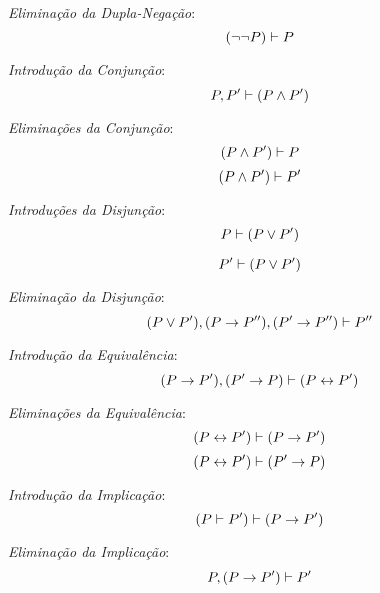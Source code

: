 \emph{Eliminação da Dupla-Negação}:
	\begin{equation*}
	(\lnot\lnot P) \vdash P
	\end{equation*}

\emph{Introdução da Conjunção}:
	\begin{equation*}
	P, P' \vdash (P \land P')
	\end{equation*}

\emph{Eliminações da Conjunção}:
	\begin{equation*}
	(P \land P') \vdash P
	\end{equation*}
	\begin{equation*}
	(P \land P') \vdash P'
	\end{equation*}

\emph{Introduções da Disjunção}:
	\begin{equation*}
	P \vdash (P \lor P')
	\end{equation*}

	\begin{equation*}
	P' \vdash (P \lor P')
	\end{equation*}

\emph{Eliminação da Disjunção}:
	\begin{equation*}
	(P \lor P'), (P \rightarrow P''), (P' \rightarrow P'') \vdash P''
	\end{equation*}

\emph{Introdução da Equivalência}:
	\begin{equation*}
	(P \rightarrow P'), (P' \rightarrow P) \vdash (P \leftrightarrow P')
	\end{equation*}

\emph{Eliminações da Equivalência}:
	\begin{equation*}
	(P \leftrightarrow P') \vdash (P \rightarrow P')
	\end{equation*}
	\begin{equation*}
	(P \leftrightarrow P') \vdash (P' \rightarrow P)
	\end{equation*}

\emph{Introdução da Implicação}:
	\begin{equation*}
	(P \vdash P') \vdash (P \rightarrow P')
	\end{equation*}

\emph{Eliminação da Implicação}:
	\begin{equation*}
	P, (P \rightarrow P') \vdash P'
	\end{equation*}

